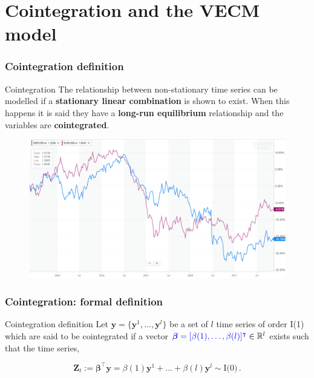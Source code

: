 \documentclass{beamer}
\begin{document}
\section{Cointegration and the VECM model}


\begin{frame}
\frametitle{Cointegration definition}
\begin{block}{Cointegration}
The relationship between non-stationary time series can be modelled if a {\bf stationary linear combination} is shown to exist.
When this happens it is said they have a {\bf long-run
equilibrium} relationship and the variables are {\color{red} {\bf cointegrated}}.
\end{block}
\begin{figure}
\includegraphics[width=0.8\paperwidth, height=0.4\paperheight]{img/motivation}
\end{figure}
\end{frame}

\begin{frame}
\frametitle{Cointegration: formal definition}
\begin{block}{Cointegration definition}
Let {\color{blue}$\mathbf{y} = \{\mathbf{y}^1, \dots, \mathbf{y}^l\}$} be a set of $l$
time series of order I(1) which are said to be cointegrated if a vector
${\color{blue}\boldsymbol\beta=[\beta(1),\dots,\beta(l)]^\intercal} \in \mathbb{R}^l$  exists such that the
time series,

\begin{equation*}
 \mathbf{Z}_t:= \boldsymbol \beta^\intercal \mathbf{y} = \beta(1) \mathbf{y}^1 + \dots + \beta(l) \mathbf{y}^l \sim
 \text{I(0)}\, .
\end{equation*}
\end{block}

\end{frame}
\end{document}
